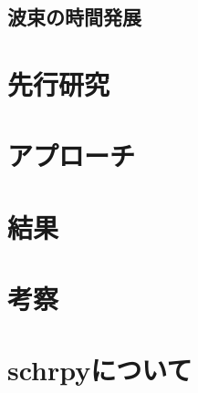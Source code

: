 \documentclass[autodetect-engine,dvipdfmx-if-dvi,ja=standard,a4paper,layout=v2]{bxjsreport}
\begin{document}
    \section{波束の時間発展}

    \chapter{先行研究}
    \chapter{アプローチ}
    \chapter{結果}
    \chapter{考察}
    \chapter{schrpyについて}
\end{document}
